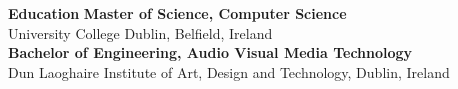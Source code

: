 \documentclass[6pt]{article}
\begin{document}
\section*{}
{\Large \bfseries Education}
\break
\break
{\bfseries Master of Science, Computer Science} \\
University College Dublin, Belfield, Ireland \\
\break
{\bfseries Bachelor of Engineering, Audio Visual Media Technology} \\
Dun Laoghaire Institute of Art, Design and Technology, Dublin, Ireland
\end{document}
